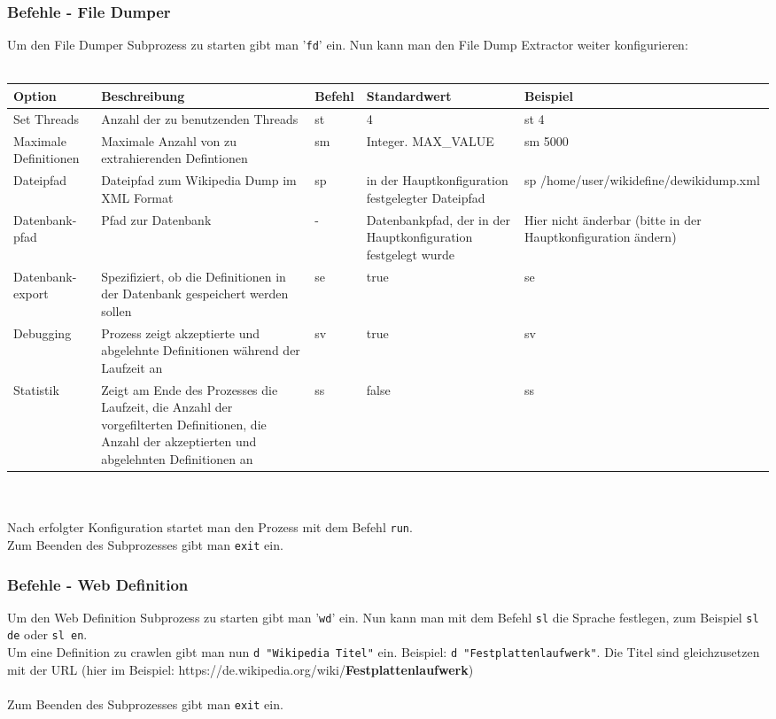 \documentclass[12pt]{article}
\begin{document}
\subsubsection{Befehle - File Dumper}
Um den File Dumper Subprozess zu starten gibt man '\texttt{fd}' ein. Nun kann man den File Dump Extractor weiter konfigurieren:
\\\\
\begin{tabular}{| p{2cm} | p{3.5cm} | l | p{3cm} | p{4cm} |}
\hline
Option & Beschreibung & Befehl & Standardwert & Beispiel \\
\hline
Set Threads & Anzahl der zu benutzenden Threads & st & 4 & st 4 \\
\hline
Maximale Definitionen & Maximale Anzahl von zu extrahierenden Defintionen & sm & Integer. MAX\_VALUE & sm 5000 \\
\hline
Dateipfad & Dateipfad zum Wikipedia Dump im XML Format & sp & in der Hauptkonfiguration festgelegter Dateipfad & sp /home/user/wikidefine/dewikidump.xml \\
\hline
Datenbank- pfad & Pfad zur Datenbank & - & Datenbankpfad, der in der Hauptkonfiguration festgelegt wurde & Hier nicht \"anderbar (bitte in der Hauptkonfiguration \"andern) \\
\hline
Datenbank- export & Spezifiziert, ob die Definitionen in der Datenbank gespeichert werden sollen & se & true	& se \\
\hline
Debugging & Prozess zeigt akzeptierte und abgelehnte Definitionen w\"ahrend der Laufzeit an & sv & true & sv \\
\hline
Statistik & Zeigt am Ende des Prozesses die Laufzeit, die Anzahl der vorgefilterten Definitionen, die Anzahl der akzeptierten und abgelehnten Definitionen an & ss & false & ss \\
\hline
\end{tabular}
\\\\
Nach erfolgter Konfiguration startet man den Prozess mit dem Befehl \texttt{run}.
\\
Zum Beenden des Subprozesses gibt man \texttt{exit} ein.

\subsubsection{Befehle - Web Definition}
Um den Web Definition Subprozess zu starten gibt man '\texttt{wd}' ein. Nun kann man mit dem Befehl \texttt{sl} die Sprache festlegen, zum Beispiel \texttt{sl de} oder \texttt{sl en}.
\\
Um eine Definition zu crawlen gibt man nun \texttt{d "Wikipedia Titel"} ein. Beispiel: \texttt{d "Festplattenlaufwerk"}. Die Titel sind gleichzusetzen mit der URL (hier im Beispiel: https://de.wikipedia.org/wiki/\textbf{Festplattenlaufwerk})
\\\\
Zum Beenden des Subprozesses gibt man \texttt{exit} ein.
\end{document}
